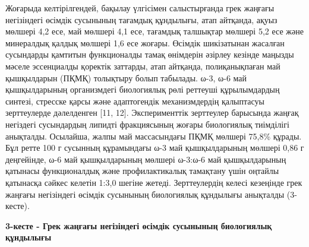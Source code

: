 \begin{multicols}{2}
Жоғарыда келтірілгендей, бақылау үлгісімен салыстырғанда грек жаңғағы
негізіндегі өсімдік сусынының тағамдық құндылығы, атап айтқанда, ақуыз
мөлшері 4,2 есе, май мөлшері 4,1 есе, тағамдық талшықтар мөлшері 5,2 есе
және минералдық қалдық мөлшері 1,6 есе жоғары. Өсімдік шикізатынан
жасалған сусындарды қамтитын функционалды тамақ өнімдерін әзірлеу
кезінде маңызды мәселе эссенциалды қоректік заттарды, атап айтқанда,
полиқанықпаған май қышқылдарын (ПҚМҚ) толықтыру болып табылады. ω-3, ω-6
май қышқылдарының организмдегі биологиялық рөлі реттеуші құрылымдардың
синтезі, стресске қарсы және адаптогендік механизмдердің қалыптасуы
зерттеулерде дәлелденген {[}11, 12{]}. Эксперименттік зерттеулер
барысында жаңғақ негіздегі сусындардың липидті фракциясының жоғары
биологиялық тиімділігі анықталды. Осылайша, жалпы май массасындағы ПҚМҚ
мөлшері 75,8\% құрады. Бұл ретте 100 г сусынның құрамындағы ω-3 май
қышқылдарының мөлшері 0,86 г деңгейінде, ω-6 май қышқылдарының мөлшері
ω-3:ω-6 май қышқылдарының қатынасы функционалдық және профилактикалық
тамақтану үшін оңтайлы қатынасқа сәйкес келетін 1:3,0 шегіне жетеді.
Зерттеулердің келесі кезеңінде грек жаңғағы негізіндегі өсімдік
сусынының биологиялық құндылығы анықталды (3-кесте).
\end{multicols}

{\bfseries 3-кесте - Грек жаңғағы негізіндегі өсімдік сусынының биологиялық құндылығы}
\begin{table}[H]
\centering
{}
\end{table}

